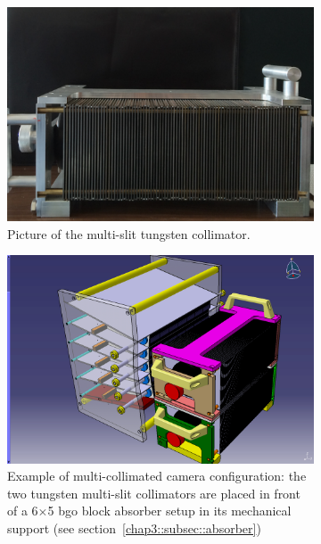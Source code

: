 \begin{figure}
\begin{subfigure}[t]{.5\textwidth}
\centering
\includegraphics[width=1\textwidth, trim={0 0 0 0.5cm},clip = true]{03_GraphicFiles/chapter3_CLaRySproto/Collimator/Collimator.pdf}
\caption{Picture of the multi-slit tungsten collimator.}
\label{chap3::fig::collimatorPicture}
\end{subfigure}
\begin{subfigure}[t]{.5\textwidth}
\centering
\includegraphics[width=1\textwidth]{03_GraphicFiles/chapter3_CLaRySproto/schemes/AbsoberCollimator.jpg}
\caption{Example of multi-collimated camera configuration: the two tungsten multi-slit collimators are placed in front of a 6$\times$5 \gls{bgo} block absorber setup in its mechanical support (see section~\ref{chap3::subsec::absorber})}
\label{chap3::fig::collimatorScheme}
\end{subfigure}
\caption{}
\label{chap3::fig::collimatorFig}
\end{figure} 


